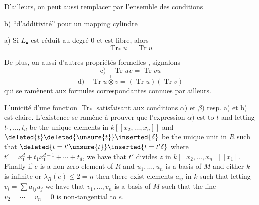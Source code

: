 D'ailleurs, on peut aussi remplacer par l'ensemble des conditions

b) ``d'additivité'' pour un mapping cylindre


a) Si $L_\bullet$ est réduit au degré $0$ et est libre, alors
\[
\operatorname{Tr}_*u=\operatorname{Tr}u
\]

 De plus, on  aussi d'autres propriétés formelles , signalons
\[
\text{c)}\quad\operatorname{Tr}uv=\operatorname{Tr}vu
\]
\[
\text{d)}\quad\operatorname{Tr}u\overset{\mathbb L}{\otimes}v=(\operatorname{Tr}u)(\operatorname{Tr}v)
\]
qui se ramènent aux formules correspondantes connues par ailleurs.

L'\uline{unicité} d'une fonction $\operatorname{Tr}_*$ satisfaisant aux conditions $\alpha)$ et $\beta)$ resp. a) et b) est claire. L'existence  se ramène à prouver que l'expression $\alpha)$ est
to $t$ and letting $t_1,\ldots,t_d$ be the unique elements in $k[[x_2,\ldots,x_n]]$ and $\deleted{t}\deleted{\unsure{t}}\inserted{\delta}$  be the unique unit in $R$ such that $\deleted{t=t'\unsure{t}}\inserted{t=t'\delta}$ where $t'=x_1^d+t_1x_1^{d-1}+\cdots+t_d$, we have that $t'$ divides $z$ in $k[[x_2,\ldots,x_n]][x_1]$.
Finally if $e$ is a non-zero element of $R$ and $u_1,\ldots,u_n$ is a basis of $M$ and either $k$ is infinite or $\lambda_R(e)\leq2=n$ then there exist elements $a_{ij}$ in $k$ such that letting $v_i=\sum a_{ij}u_j$ we have that $v_1,\ldots,v_n$ is a basis of $M$ such that the line $v_2=\cdots=v_n=0$ is non-tangential to $e$.

